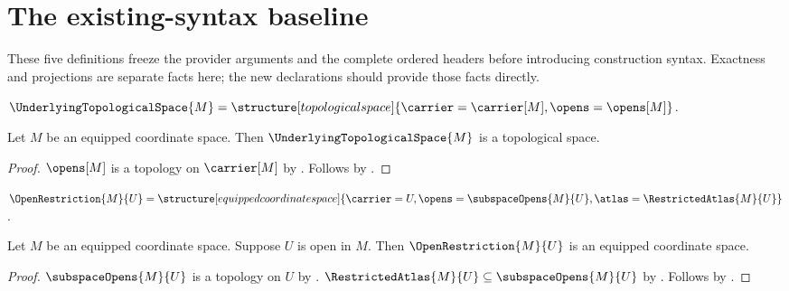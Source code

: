 

\section{The existing-syntax baseline}

These five definitions freeze the provider arguments and the complete ordered
headers before introducing construction syntax. Exactness and projections are
separate facts here; the new declarations should provide those facts directly.

\begin{definition}\label{underlying_topological_space}
    $\UnderlyingTopologicalSpace{M}=\structure[topological space]{
        \carrier=\carrier[M],\opens=\opens[M]}$.
\end{definition}

\begin{classification}\label{underlying_topological_space_result}
    Let $M$ be an equipped coordinate space.
    Then $\UnderlyingTopologicalSpace{M}$ is a topological space.
\end{classification}
\begin{proof}
    $\opens[M]$ is a topology on $\carrier[M]$
        by .
    Follows by .
\end{proof}

\begin{definition}\label{open_restriction}
    $\OpenRestriction{M}{U}=\structure[equipped coordinate space]{
        \carrier=U,\opens=\subspaceOpens{M}{U},
        \atlas=\RestrictedAtlas{M}{U}}$.
\end{definition}

\begin{classification}\label{open_restriction_result}
    Let $M$ be an equipped coordinate space.
    Suppose $U$ is open in $M$.
    Then $\OpenRestriction{M}{U}$ is an equipped coordinate space.
\end{classification}
\begin{proof}
    $\subspaceOpens{M}{U}$ is a topology on $U$
        by .
    $\RestrictedAtlas{M}{U}\subseteq\subspaceOpens{M}{U}$
        by .
    Follows by .
\end{proof}

